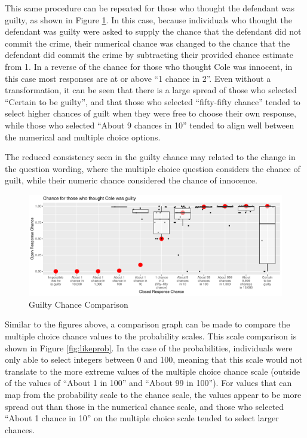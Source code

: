 \documentclass[print]{nuthesis}
\begin{document}
This same procedure can be repeated for those who thought the defendant was guilty, as shown in Figure \ref{fig:likecomp2}.
In this case, because individuals who thought the defendant was guilty were asked to supply the chance that the defendant did not commit the crime, their numerical chance was changed to the chance that the defendant did commit the crime by subtracting their provided chance estimate from 1.
In a reverse of the chance for those who thought Cole was innocent, in this case most responses are at or above ``1 chance in 2''.
Even without a transformation, it can be seen that there is a large spread of those who selected ``Certain to be guilty'', and that those who selected ``fifty-fifty chance'' tended to select higher chances of guilt when they were free to choose their own response, while those who selected ``About 9 chances in 10'' tended to align well between the numerical and multiple choice options.

The reduced consistency seen in the guilty chance may related to the change in the question wording, where the multiple choice question considers the chance of guilt, while their numeric chance considered the chance of innocence.

\begin{figure}

{\centering \includegraphics[width=\linewidth]{thesis_files/figure-latex/likecomp2-1} 

}

\caption{Guilty Chance Comparison}\label{fig:likecomp2}
\end{figure}

Similar to the figures above, a comparison graph can be made to compare the multiple choice chance values to the probability scales.
This scale comparison is shown in Figure \ref{fig:likeprob}.
In the case of the probabilities, individuals were only able to select integers between 0 and 100, meaning that this scale would not translate to the more extreme values of the multiple choice chance scale (outside of the values of ``About 1 in 100'' and ``About 99 in 100'').
For values that can map from the probability scale to the chance scale, the values appear to be more spread out than those in the numerical chance scale, and those who selected ``About 1 chance in 10'' on the multiple choice scale tended to select larger chances.
\end{document}
